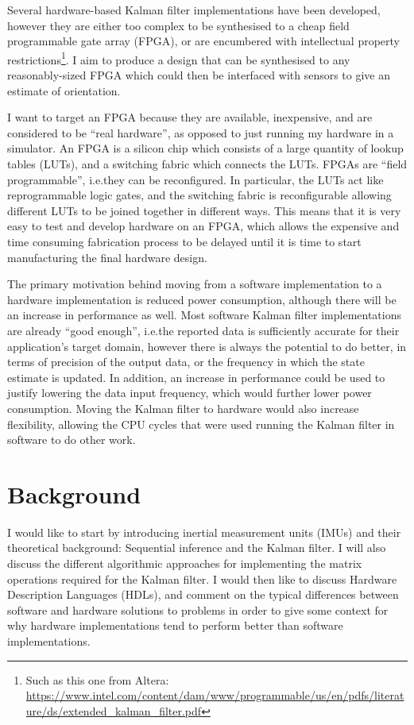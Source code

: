 \documentclass[12pt]{article}
\begin{document}
Several hardware-based Kalman filter implementations have been developed, however they are either too complex \cite{mills_2016} to be synthesised to a cheap field programmable gate array (FPGA), or are encumbered with intellectual property restrictions\footnote{Such as this one from Altera: \url{https://www.intel.com/content/dam/www/programmable/us/en/pdfs/literature/ds/extended_kalman_filter.pdf}}. I aim to produce a design that can be synthesised to any reasonably-sized FPGA which could then be interfaced with sensors to give an estimate of orientation.

I want to target an FPGA because they are available, inexpensive, and are considered to be ``real hardware'', as opposed to just running my hardware in a simulator. An FPGA is a silicon chip which consists of a large quantity of lookup tables (LUTs), and a switching fabric which connects the LUTs. FPGAs are ``field programmable'', i.e.\@ they can be reconfigured. In particular, the LUTs act like reprogrammable logic gates, and the switching fabric is reconfigurable allowing different LUTs to be joined together in different ways. This means that it is very easy to test and develop hardware on an FPGA, which allows the expensive and time consuming fabrication process to be delayed until it is time to start manufacturing the final hardware design.

The primary motivation behind moving from a software implementation to a hardware implementation is reduced power consumption, although there will be an increase in performance as well. Most software Kalman filter implementations are already ``good enough'', i.e.\@ the reported data is sufficiently accurate for their application's target domain, however there is always the potential to do better, in terms of precision of the output data, or the frequency in which the state estimate is updated. In addition, an increase in performance could be used to justify lowering the data input frequency, which would further lower power consumption. Moving the Kalman filter to hardware would also increase flexibility, allowing the CPU cycles that were used running the Kalman filter in software to do other work.

\section{Background}

I would like to start by introducing inertial measurement units (IMUs) and their theoretical background: Sequential inference and the Kalman filter. I will also discuss the different algorithmic approaches for implementing the matrix operations required for the Kalman filter. I would then like to discuss Hardware Description Languages (HDLs), and comment on the typical differences between software and hardware solutions to problems in order to give some context for why hardware implementations tend to perform better than software implementations.
\end{document}
